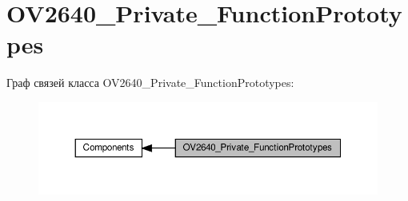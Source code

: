 \hypertarget{group___o_v2640___private___function_prototypes}{}\section{O\+V2640\+\_\+\+Private\+\_\+\+Function\+Prototypes}
\label{group___o_v2640___private___function_prototypes}
Граф связей класса O\+V2640\+\_\+\+Private\+\_\+\+Function\+Prototypes\+:
\nopagebreak
\begin{figure}[H]
\begin{center}
\leavevmode
\includegraphics[width=350pt]{group___o_v2640___private___function_prototypes}
\end{center}
\end{figure}
